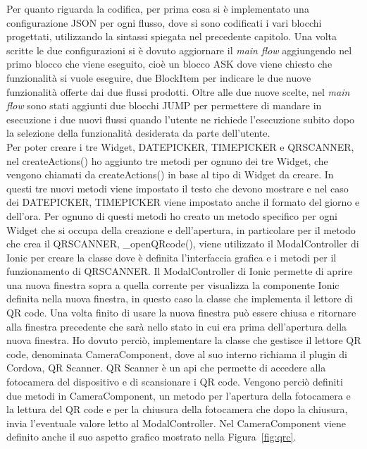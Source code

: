 Per quanto riguarda la codifica, per prima cosa si è implementato una configurazione JSON per ogni flusso, dove si sono codificati i vari blocchi progettati, utilizzando la sintassi spiegata nel precedente capitolo. Una volta scritte le due configurazioni si è dovuto aggiornare il \emph{main flow} aggiungendo nel primo blocco che viene eseguito, cioè un blocco ASK dove viene chiesto che funzionalità si vuole eseguire, due BlockItem per indicare le due nuove funzionalità offerte dai due flussi prodotti. Oltre alle due nuove scelte, nel \emph{main flow} sono stati aggiunti due blocchi JUMP per permettere di mandare in esecuzione i due nuovi flussi quando l'utente ne richiede l'esecuzione subito dopo la selezione della funzionalità desiderata da parte dell'utente.\\

Per poter creare i tre Widget, DATEPICKER, TIMEPICKER e QRSCANNER, nel createActions() ho aggiunto tre metodi per ognuno dei tre Widget, che vengono chiamati da createActions() in base al tipo di Widget da creare. In questi tre nuovi metodi viene impostato il testo che devono mostrare e nel caso dei DATEPICKER, TIMEPICKER viene impostato anche il formato del giorno e dell'ora. Per ognuno di questi metodi ho creato un metodo specifico per ogni Widget che si occupa della creazione e dell'apertura, in particolare per il metodo che crea il QRSCANNER, \_openQRcode(), viene utilizzato il ModalController di Ionic per creare la classe dove è definita l'interfaccia grafica e i metodi per il funzionamento di QRSCANNER. Il ModalController di Ionic permette di aprire una nuova finestra sopra a quella corrente per visualizza la componente Ionic definita nella nuova finestra, in questo caso la classe che implementa il lettore di \gls{QR code}\ap{[g]}. Una volta finito di usare la nuova finestra può essere chiusa e ritornare alla finestra precedente che sarà nello stato in cui era prima dell'apertura della nuova finestra. Ho dovuto perciò, implementare la classe che gestisce il lettore \gls{QR code}\ap{[g]}, denominata CameraComponent, dove al suo interno richiama il plugin di Cordova, QR Scanner. QR Scanner è un \gls{api}\ap{[g]} che permette di accedere alla fotocamera del dispositivo e di scansionare i \gls{QR code}\ap{[g]}. Vengono perciò definiti due metodi in CameraComponent, un metodo per l'apertura della fotocamera e la lettura del \gls{QR code}\ap{[g]} e per la chiusura della fotocamera che dopo la chiusura, invia l'eventuale valore letto al ModalController. Nel CameraComponent viene definito anche il suo aspetto grafico mostrato nella Figura~\ref{fig:qrc}.\\
 
